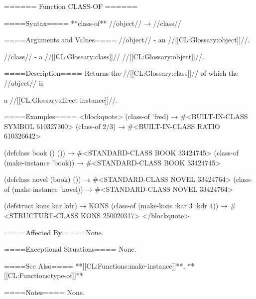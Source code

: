====== Function CLASS-OF ======

====Syntax====
**class-of** //object// → //class//

====Arguments and Values====
//object// - an //[[CL:Glossary:object]]//.

//class// - a //[[CL:Glossary:class]]// //[[CL:Glossary:object]]//.

====Description====
Returns the //[[CL:Glossary:class]]// of which the //object// is

a //[[CL:Glossary:direct instance]]//.

====Examples====
<blockquote> (class-of 'fred) → #<BUILT-IN-CLASS SYMBOL 610327300> (class-of 2/3) → #<BUILT-IN-CLASS RATIO 610326642>

(defclass book () ()) → #<STANDARD-CLASS BOOK 33424745> (class-of (make-instance 'book)) → #<STANDARD-CLASS BOOK 33424745>

(defclass novel (book) ()) → #<STANDARD-CLASS NOVEL 33424764> (class-of (make-instance 'novel)) → #<STANDARD-CLASS NOVEL 33424764>

(defstruct kons kar kdr) → KONS (class-of (make-kons :kar 3 :kdr 4)) → #<STRUCTURE-CLASS KONS 250020317> </blockquote>

====Affected By====
None.

====Exceptional Situations====
None.

====See Also====
**[[CL:Functions:make-instance]]**, **[[CL:Functions:type-of]]**

====Notes====
None.

